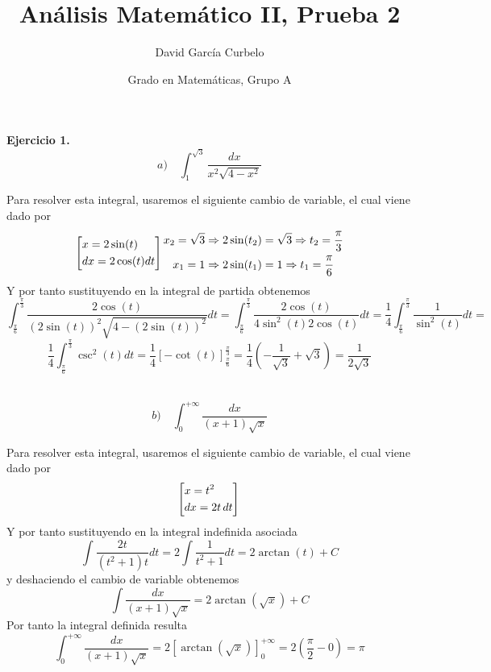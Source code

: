 \documentclass[fleqn]{article}
\author{David García Curbelo}
\title{Análisis Matemático II, Prueba 2}
\date{Grado en Matemáticas, Grupo A}
\begin{document}
    \maketitle
    \setcounter{page}{1}
    \pagestyle{plain}

    \textbf{Ejercicio 1.} \\
    
    $$a) \quad \int_1^{\sqrt{3}} \frac{dx}{x^2\sqrt{4-x^2}}$$    

    Para resolver esta integral, usaremos el siguiente cambio de variable, el cual viene dado por 
    \begin{equation*}
        \left[
            \begin{aligned}
                &x = 2\sin(t) \\
                &dx = 2\cos(t) dt
            \end{aligned}
        \right] \\
        \begin{aligned}
            x_2 = \sqrt{3} \Rightarrow 2 \sin(t_2) &= \sqrt{3} \Rightarrow t_2 = \frac{\pi}{3} \\
            x_1 = 1 \Rightarrow 2 \sin(t_1) &= 1 \Rightarrow t_1 = \frac{\pi}{6}
        \end{aligned}
    \end{equation*}
    Y por tanto sustituyendo en la integral de partida obtenemos 
    $$\int_{\frac{\pi}{6}}^{\frac{\pi}{3}} \frac{2\cos(t)}{(2\sin(t))^2 \sqrt{4-( 2\sin(t))^2}}dt = \int_{\frac{\pi}{6}}^{\frac{\pi}{3}} \frac{2\cos(t)}{4\sin^2(t) 2\cos(t)}dt = \frac{1}{4}\int_{\frac{\pi}{6}}^{\frac{\pi}{3}} \frac{1}{\sin^2(t)}dt = $$
    $$ \frac{1}{4}\int_{\frac{\pi}{6}}^{\frac{\pi}{3}} \csc^2(t) dt = \frac{1}{4} \left[-\cot(t)\right]_{\frac{\pi}{6}}^{\frac{\pi}{3}} = \frac{1}{4}\left(-\frac{1}{\sqrt{3}} + \sqrt{3} \right) = \boxed{\frac{1}{2\sqrt{3}}}$$

    $\quad$\\ \\

    $$b) \quad \int_0^{+\infty} \frac{dx}{(x+1)\sqrt{x}}$$    

    Para resolver esta integral, usaremos el siguiente cambio de variable, el cual viene dado por 
    \begin{equation*}
        \left[
            \begin{aligned}
                &x = t^2 \\
                &dx = 2t \thinspace dt
            \end{aligned}
        \right] \\
    \end{equation*}
    Y por tanto sustituyendo en la integral indefinida asociada
    $$\int \frac{2t}{(t^2+1)t} dt = 2 \int \frac{1}{t^2+1} dt = 2\arctan(t) + C$$
    y deshaciendo el cambio de variable obtenemos
    $$\int \frac{dx}{(x+1)\sqrt{x}} = 2\arctan(\sqrt{x}) + C $$
    Por tanto la integral definida resulta
    $$\int_0^{+\infty} \frac{dx}{(x+1)\sqrt{x}} = 2\left[\arctan(\sqrt{x})\right]_0^{+\infty} = 2\left(\frac{\pi}{2} - 0\right) = \boxed{\pi}$$
\end{document}
